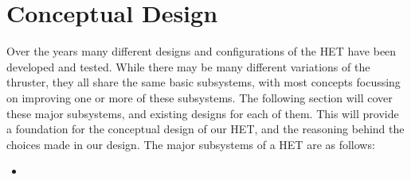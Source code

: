 \chapter{Conceptual Design}

Over the years many different designs and configurations of the \ac{HET} have been developed and tested. While there may be many different variations of the thruster, they all share the same basic subsystems, with most concepts focussing on improving one or more of these subsystems. The following section will cover these major subsystems, and existing designs for each of them. This will provide a foundation for the conceptual design of our \ac{HET}, and the reasoning behind the choices made in our design. The major subsystems of a \ac{HET} are as follows:

\begin{itemize}
    \item 
\end{itemize}






